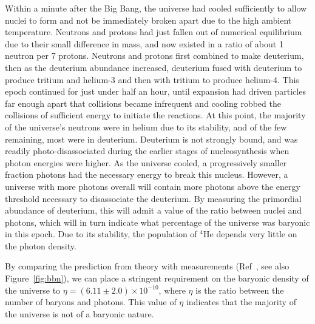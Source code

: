 Within a minute after the Big Bang, the universe had cooled sufficiently to allow nuclei to form and not be immediately broken apart due to the high ambient temperature. Neutrons and protons had just fallen out of numerical equilibrium due to their small difference in mass, and now existed in a ratio of about 1 neutron per 7 protons. Neutrons and protons first combined to make deuterium, then as the deuterium abundance increased, deuterium fused with deuterium to produce tritium and helium-3 and then with tritium to produce helium-4. This epoch continued for just under half an hour, until expansion had driven particles far enough apart that collisions became infrequent and cooling robbed the collisions of sufficient energy to initiate the reactions. At this point, the majority of the universe's neutrons were in helium due to its stability, and of the few remaining, most were in deuterium. Deuterium is not strongly bound, and was readily photo-disassociated during the earlier stages of nucleosynthesis when photon energies were higher. As the universe cooled, a progressively smaller fraction photons had the necessary energy to break this nucleus. However, a universe with more photons overall will contain more photons above the energy threshold necessary to disassociate the deuterium. By measuring the primordial abundance of deuterium, this will admit a value of the ratio between nuclei and photons, which will in turn indicate what percentage of the universe was baryonic in this epoch. Due to its stability, the population of $^4$He depends very little on the photon density.

By comparing the prediction from theory with measurements (Ref~\cite{Steigman:2007xt}, see also Figure~\ref{fig:bbn}), we can place a stringent requirement on the baryonic density of the universe to $\eta = (6.11\pm2.0)\times10^{-10}$, where $\eta$ is the ratio between the number of baryons and photons. This value of $\eta$ indicates that the majority of the universe is not of a baryonic nature.

